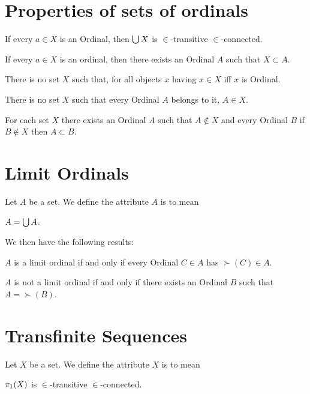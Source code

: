 \documentclass{article}
\begin{document}
\section*{Properties of sets of ordinals}

\begin{thm}
\item\label{ordinal1:23} If every $a\in X$ is an Ordinal,
  then $\bigcup X$ is $\in$-transitive $\in$-connected.
\item\label{ordinal1:24} If every $a\in X$ is an ordinal,
  then there exists an Ordinal $A$ such that $X\subset A$.
\item\label{ordinal1:25} There is no set $X$ such that, for all objects
  $x$ having $x\in X$ iff $x$ is Ordinal.
\item\label{ordinal1:26} There is no set $X$ such that every Ordinal $A$
  belongs to it, $A\in X$.
\item\label{ordinal1:27} For each set $X$ there exists an Ordinal $A$
  such that $A\notin X$ and every Ordinal $B$ if $B\notin X$ then
  $A\subset B$.
\end{thm}

\section*{Limit Ordinals}

\begin{definition}
Let $A$ be a set.
We define the attribute $A$ is  to mean
\begin{defn}
\item $A=\bigcup A$.
\end{defn}
\end{definition}

We then have the following results:
\begin{thm}
\item\label{ordinal1:28} $A$ is a limit ordinal if and only if every
  Ordinal $C\in A$ has $\succ(C)\in A$.
\item\label{ordinal1:29} $A$ is not a limit ordinal if and only if there
  exists an Ordinal $B$ such that $A=\succ(B)$.
\end{thm}

\section*{Transfinite Sequences}

\begin{definition}
Let $X$ be a set.
We define the attribute $X$ is  to mean
\begin{defn}
\item $\pi_{1}(X)$ is $\in$-transitive $\in$-connected.
\end{defn}
\end{definition}
\end{document}
